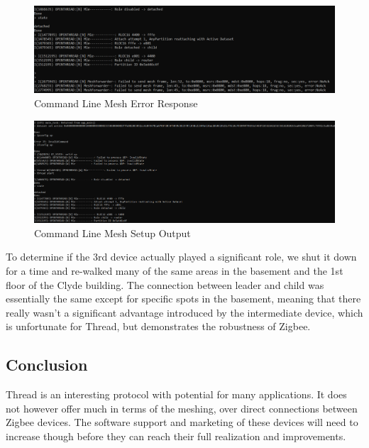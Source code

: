 \documentclass[letterpaper,twocolumn,10pt]{article}
\begin{document}
\begin{figure}
    \centering
    \includegraphics[width=0.75\linewidth]{Figures/Mesh_Error_Response.png}
    \caption{Command Line Mesh Error Response}
    \label{fig:mesh_error}
\end{figure}

\begin{figure}
    \centering
    \includegraphics[width=0.75\linewidth]{Figures/Mesh_Initial_Setup.png}
    \caption{Command Line Mesh Setup Output}
    \label{fig:mesh_setup}
\end{figure}

To determine if the 3rd device actually played a significant role, we shut it down for a time and re-walked many of the same areas in the basement and the 1st floor of the Clyde building. The connection between leader and child was essentially the same except for specific spots in the basement, meaning that there really wasn't a significant advantage introduced by the intermediate device, which is unfortunate for Thread, but demonstrates the robustness of Zigbee.

\subsection*{Conclusion}

Thread is an interesting protocol with potential for many applications. It does not however offer much in terms of the meshing, over direct connections between Zigbee devices. The software support and marketing of these devices will need to increase though before they can reach their full realization and improvements.

\printbibliography
\end{document}
